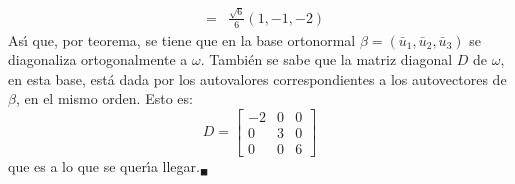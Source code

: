 \begin{solucion}
\begin{eqnarray*}
  & = & \frac{\sqrt{6}}{6}(1,-1,-2)
 \end{eqnarray*}
 As\'{\i} que, por teorema, se tiene que en la base ortonormal $\beta = \left( \bar{u}_1, \bar{u}_2, \bar{u}_3 \right)$ se diagonaliza ortogonalmente a $\omega$. Tambi\'en se sabe que la matriz diagonal $D$ de $\omega$, en esta base, est\'a dada por los autovalores correspondientes a los autovectores de $\beta$, en el mismo orden. Esto es:
 \begin{equation*}
  D = 
  \begin{bmatrix}
   -2 & 0 & 0 \\
    0 & 3 & 0 \\
    0 & 0 & 6
  \end{bmatrix}
 \end{equation*}
 que es a lo que se quer\'{\i}a llegar.${}_{\blacksquare}$

\end{solucion}

